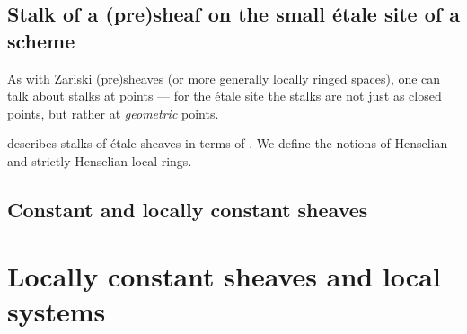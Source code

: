 \subsection{Stalk of a (pre)sheaf on the small \'etale site of a scheme}

As with Zariski (pre)sheaves (or more generally locally ringed spaces), one can talk about stalks at points --- for the \'etale site the stalks are not just as closed points, but rather at \emph{geometric} points.




 describes stalks of \'etale sheaves in terms of . We define the notions of Henselian and strictly Henselian local rings.






















\subsection{Constant and locally constant sheaves}


\section{Locally constant sheaves and local systems}



